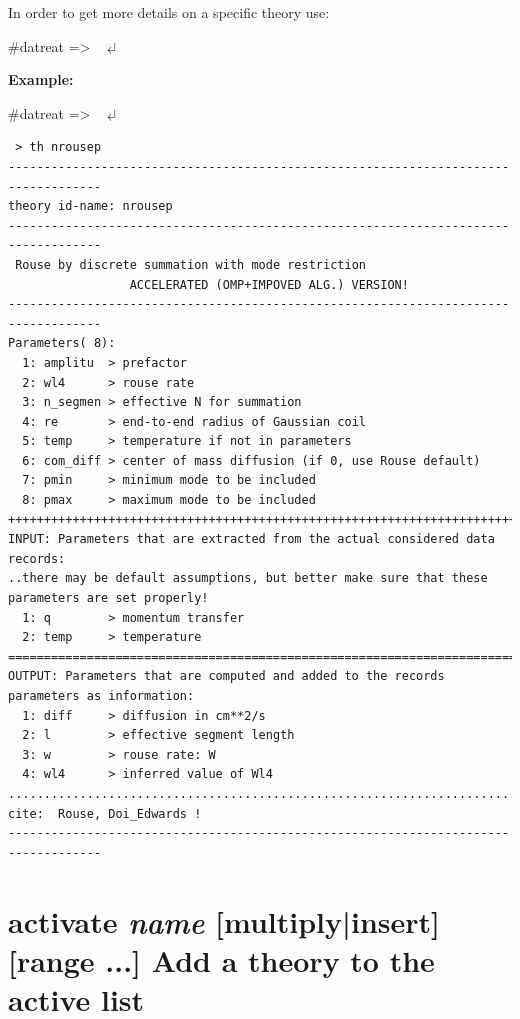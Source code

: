 \documentclass[11pt,fleqn]{book} %
\newcommand{\linespace}{\vspace{4ex}}
\newcommand{\return}{$\carriagereturn$} %
\newcommand{\sysprompt}{{\color{green}...\textgreater} ~ }
\newcommand{\dtrprompt}{{\color{blue}\#datreat =\textgreater} ~ }
\newcommand{\enter}[1]{{\color{red} \bf #1}}
\newcommand{\cmdl}[2]{{\color{red}{\bf \underline{#1} #2}}}
\newcommand{\var}[1]{{\color{red} \bf \it #1}}
\newcommand{\opt}[1]{[#1]}
\newcommand{\desc}[1]{\hskip 0.5cm {\color{descgray} #1}}
\begin{document}
\linespace
In order to get more details on a specific theory use:
\begin{corollary}
\dtrprompt \cmdl{th}{theoryname}   \return
\end{corollary}
{\bf Example:}
\begin{corollary}
\dtrprompt \cmdl{th}{nrousep}   \return
\color{blue}
\footnotesize
\begin{verbatim}
 > th nrousep
-----------------------------------------------------------------------------------
theory id-name: nrousep 
-----------------------------------------------------------------------------------
 Rouse by discrete summation with mode restriction
                 ACCELERATED (OMP+IMPOVED ALG.) VERSION!
-----------------------------------------------------------------------------------
Parameters( 8): 
  1: amplitu  > prefactor
  2: wl4      > rouse rate
  3: n_segmen > effective N for summation
  4: re       > end-to-end radius of Gaussian coil
  5: temp     > temperature if not in parameters
  6: com_diff > center of mass diffusion (if 0, use Rouse default)
  7: pmin     > minimum mode to be included
  8: pmax     > maximum mode to be included
++++++++++++++++++++++++++++++++++++++++++++++++++++++++++++++++++++++++++++++++++
INPUT: Parameters that are extracted from the actual considered data records:
..there may be default assumptions, but better make sure that these parameters are set properly!
  1: q        > momentum transfer
  2: temp     > temperature
===================================================================================
OUTPUT: Parameters that are computed and added to the records parameters as information:
  1: diff     > diffusion in cm**2/s
  2: l        > effective segment length
  3: w        > rouse rate: W
  4: wl4      > inferred value of Wl4
...................................................................................
cite:  Rouse, Doi_Edwards !
-----------------------------------------------------------------------------------
\end{verbatim}
\normalsize
\color{black} 
\end{corollary}

\section{activate \var{name} \opt{multiply|insert} \opt{range ...}   \desc{Add a theory to the active list}}
\end{document}
